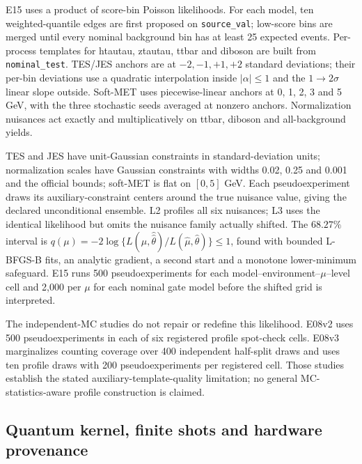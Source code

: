\documentclass[11pt,a4paper]{article}
\begin{document}
E15 uses a product of score-bin Poisson likelihoods. For each model, ten
weighted-quantile edges are first proposed on \texttt{source\_val}; low-score
bins are merged until every nominal background bin has at least 25 expected
events. Per-process templates for htautau, ztautau, ttbar and diboson are built
from \texttt{nominal\_test}. TES/JES anchors are at $-2,-1,+1,+2$ standard
deviations; their per-bin deviations use a quadratic interpolation inside
$\lvert\alpha\rvert\leq1$ and the $1\to2\sigma$ linear slope outside. Soft-MET
uses piecewise-linear anchors at 0, 1, 2, 3 and 5 GeV, with the three stochastic
seeds averaged at nonzero anchors. Normalization nuisances act exactly and
multiplicatively on ttbar, diboson and all-background yields.

TES and JES have unit-Gaussian constraints in standard-deviation units;
normalization scales have Gaussian constraints with widths 0.02, 0.25 and
0.001 and the official bounds; soft-MET is flat on $[0,5]$ GeV. Each
pseudoexperiment draws its auxiliary-constraint centers around the true
nuisance value, giving the declared unconditional ensemble. L2 profiles all
six nuisances; L3 uses the identical likelihood but omits the nuisance family
actually shifted. The $68.27\%$ interval is
$q(\mu)=-2\log\{L(\mu,\widehat{\widehat\theta})/
L(\hat\mu,\hat\theta)\}\leq1$, found with bounded L-BFGS-B fits, an analytic
gradient, a second start and a monotone lower-minimum safeguard. E15 runs 500
pseudoexperiments for each model--environment--$\mu$--level cell and 2,000 per
$\mu$ for each nominal gate model before the shifted grid is interpreted.

The independent-MC studies do not repair or redefine this likelihood. E08v2
uses 500 pseudoexperiments in each of six registered profile spot-check cells.
E08v3 marginalizes counting coverage over 400 independent half-split draws and
uses ten profile draws with 200 pseudoexperiments per registered cell. Those
studies establish the stated auxiliary-template-quality limitation; no general
MC-statistics-aware profile construction is claimed.

\subsection{Quantum kernel, finite shots and hardware provenance}
\end{document}
